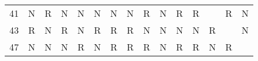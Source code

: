 \documentclass[17pt]{memoir}
\begin{document}
\begin{tabular}{c|cccccccccccccc}
41 & N                         & \cellcolor[HTML]{FAC22B}R & N                         & N                         & N                         & N                         & N                         & \cellcolor[HTML]{FAC22B}R & N                         & \cellcolor[HTML]{FAC22B}R & \cellcolor[HTML]{FAC22B}R & \cellcolor{black}         & \cellcolor[HTML]{FAC22B}R & N                         \\
43 & \cellcolor[HTML]{FAC22B}R & N                         & \cellcolor[HTML]{FAC22B}R & N                         & \cellcolor[HTML]{FAC22B}R & \cellcolor[HTML]{FAC22B}R & \cellcolor[HTML]{FAC22B}R & N                         & N                         & N                         & N                         & \cellcolor[HTML]{FAC22B}R & \cellcolor{black}         & N                         \\
47 & N                         & N                         & N                         & \cellcolor[HTML]{FAC22B}R & N                         & \cellcolor[HTML]{FAC22B}R & \cellcolor[HTML]{FAC22B}R & \cellcolor[HTML]{FAC22B}R & N                         & \cellcolor[HTML]{FAC22B}R & \cellcolor[HTML]{FAC22B}R & N                         & \cellcolor[HTML]{FAC22B}R & \cellcolor{black}        
\end{tabular}
\end{document}
